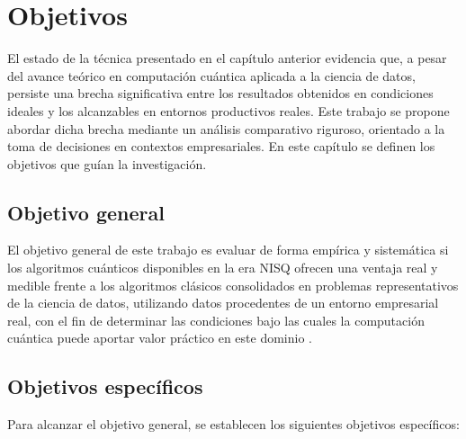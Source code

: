 \chapter{Objetivos}\label{cap:objetivos}

El estado de la técnica presentado en el capítulo anterior evidencia que, a pesar del avance teórico en computación cuántica aplicada a la ciencia de datos, persiste una brecha significativa entre los resultados obtenidos en condiciones ideales y los alcanzables en entornos productivos reales. Este trabajo se propone abordar dicha brecha mediante un análisis comparativo riguroso, orientado a la toma de decisiones en contextos empresariales. En este capítulo se definen los objetivos que guían la investigación.

\section{Objetivo general}

El objetivo general de este trabajo es evaluar de forma empírica y sistemática si los algoritmos cuánticos disponibles en la era NISQ ofrecen una ventaja real y medible frente a los algoritmos clásicos consolidados en problemas representativos de la ciencia de datos, utilizando datos procedentes de un entorno empresarial real, con el fin de determinar las condiciones bajo las cuales la computación cuántica puede aportar valor práctico en este dominio \citep{preskill2018, biamonte2017}.

\section{Objetivos específicos}

Para alcanzar el objetivo general, se establecen los siguientes objetivos específicos:

